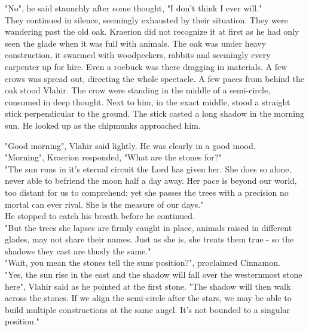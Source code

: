 \documentclass[smalldemyvopaper,11pt,twoside,onecolumn,openright,extrafontsizes]{memoir}
\begin{document}
"No", he said staunchly after some thought, "I don't think I ever will."\\

They continued in silence, seemingly exhausted by their situation. They were wandering past the old oak. Kraerion did not recognize it at first as he had only seen the glade when it was full with animals. The oak was under heavy construction, it swarmed with woodpeckers, rabbits and seemingly every carpenter up for hire. Even a roebuck was there dragging in materials. A few crows was spread out, directing the whole spectacle. A few paces from behind the oak stood Vlahir. The crow were standing in the middle of a semi-circle, consumed in deep thought. Next to him, in the exact middle, stood a straight stick perpendicular to the ground. The stick casted a long shadow in the morning sun. He looked up as the chipmunks approached him. 

"Good morning", Vlahir said lightly. He was clearly in a good mood. \\

"Morning", Kraerion responded, "What are the stones for?"\\

"The sun runs in it's eternal circuit the Lord has given her. She does so alone, never able to befriend the moon half a day away. Her pace is beyond our world, too distant for us to comprehend; yet she passes the trees with a precision no mortal can ever rival. She is the measure of our days."\\

He stopped to catch his breath before he continued.\\

"But the trees she lapses are firmly caught in place, animals raised in different glades, may not share their names. Just as she is, she treats them true - so the shadows they cast are thusly the same."\\

"Wait, you mean the stones tell the suns position?", proclaimed Cinnamon.\\

"Yes, the sun rise in the east and the shadow will fall over the westernmost stone here", Vlahir said as he pointed at the first stone. "The shadow will then walk across the stones. If we align the semi-circle after the stars, we may be able to build multiple constructions at the same angel. It's not bounded to a singular position."\\
\end{document}
